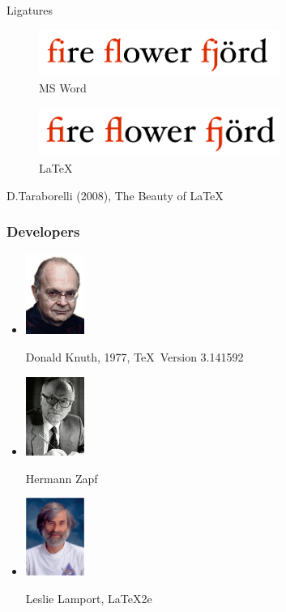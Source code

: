 \documentclass[10pt,times]{beamer}
\begin{document}
\begin{frame}{Ligatures}
\begin{figure}
\centering
\includegraphics[width=0.7\textwidth]{figs/ligatures_word.png}
\caption{MS Word}
\end{figure}
\begin{figure}
\centering
\includegraphics[width=0.7\textwidth]{figs/ligatures_latex.png}
\caption{\LaTeX}
\end{figure}
\flushright
D.Taraborelli (2008), The Beauty of \LaTeX
\end{frame}

\begin{frame}
\frametitle{Developers}
\begin{itemize}
\item
\parbox{0.25\textwidth}{\includegraphics[width=0.15\textwidth]{figs/Donald_Knuth.png}}\hspace{0cm}
\parbox{0.65\textwidth}{Donald Knuth, 1977, \TeX ~Version 3.141592}
\item
\parbox{0.25\textwidth}{\includegraphics[width=0.15\textwidth]{figs/Hermann.jpg}}\hspace{0cm}
\parbox{0.65\textwidth}{Hermann Zapf}
\item
\parbox{0.25\textwidth}{\includegraphics[width=0.15\textwidth]{figs/Leslie.png}}\hspace{0cm}
\parbox{0.65\textwidth}{Leslie Lamport, \LaTeX2e}
\end{itemize}
\end{frame}
\end{document}
